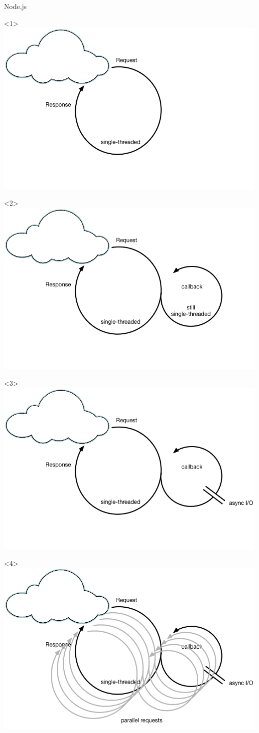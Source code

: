 \begin{frame}[fragile]{Node.js}

\begin{onlyenv}<1>
\includegraphics[width=.7\textwidth]{../Nodejs1.png}
\end{onlyenv}

\begin{onlyenv}<2>
\includegraphics[width=.7\textwidth]{../Nodejs2.png}
\end{onlyenv}

\begin{onlyenv}<3>
\includegraphics[width=.7\textwidth]{../Nodejs3.png}
\end{onlyenv}

\begin{onlyenv}<4>
\includegraphics[width=.7\textwidth]{../Nodejs4.png}
\end{onlyenv}


\end{frame}
